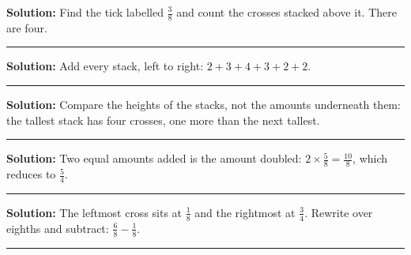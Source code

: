 \documentclass[12pt]{article}
\begin{document}




\textbf{Solution:} Find the tick labelled $\frac{3}{8}$ and count the crosses stacked above it. There are four. 

\vspace{0.15cm}\noindent\rule{\linewidth}{0.2pt}\vspace{0.15cm}


\textbf{Solution:} Add every stack, left to right: $2 + 3 + 4 + 3 + 2 + 2$. 

\vspace{0.15cm}\noindent\rule{\linewidth}{0.2pt}\vspace{0.15cm}


\textbf{Solution:} Compare the heights of the stacks, not the amounts underneath them: the tallest stack has four crosses, one more than the next tallest. 

\vspace{0.15cm}\noindent\rule{\linewidth}{0.2pt}\vspace{0.15cm}


\textbf{Solution:} Two equal amounts added is the amount doubled: $2 \times \frac{5}{8} = \frac{10}{8}$, which reduces to $\frac{5}{4}$. 

\vspace{0.15cm}\noindent\rule{\linewidth}{0.2pt}\vspace{0.15cm}


\textbf{Solution:} The leftmost cross sits at $\frac{1}{8}$ and the rightmost at $\frac{3}{4}$. Rewrite over eighths and subtract: $\frac{6}{8} - \frac{1}{8}$. 

\vspace{0.15cm}\noindent\rule{\linewidth}{0.2pt}\vspace{0.15cm}
\end{document}
